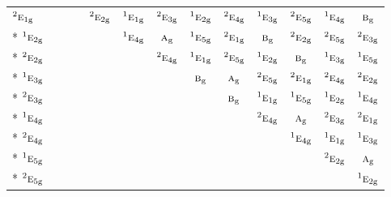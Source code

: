 \documentclass[10pt,a4paper]{article}
\numberwithin{equation}{section}
\newcommand{\irr}[1]{\text{\normalfont\scshape #1}}
\newcommand{\conjpair}[1]{{}^{#1}}
\newcommand{\ptag}[1]{\mathrm{#1}}
\begin{document}
{\begin{longtable}{@{}lcccccccccccc@{}}
$\conjpair{2}\irr{e}_{1\ptag{g}}$ &  &  &  & $\conjpair{2}\irr{e}_{2\ptag{g}}$ & $\conjpair{1}\irr{e}_{1\ptag{g}}$ & $\conjpair{2}\irr{e}_{3\ptag{g}}$ & $\conjpair{1}\irr{e}_{2\ptag{g}}$ & $\conjpair{2}\irr{e}_{4\ptag{g}}$ & $\conjpair{1}\irr{e}_{3\ptag{g}}$ & $\conjpair{2}\irr{e}_{5\ptag{g}}$ & $\conjpair{1}\irr{e}_{4\ptag{g}}$ & $\irr{b}_{\ptag{g}}$\\*
$\conjpair{1}\irr{e}_{2\ptag{g}}$ &  &  &  &  & $\conjpair{1}\irr{e}_{4\ptag{g}}$ & $\irr{a}_{\ptag{g}}$ & $\conjpair{1}\irr{e}_{5\ptag{g}}$ & $\conjpair{2}\irr{e}_{1\ptag{g}}$ & $\irr{b}_{\ptag{g}}$ & $\conjpair{2}\irr{e}_{2\ptag{g}}$ & $\conjpair{2}\irr{e}_{5\ptag{g}}$ & $\conjpair{2}\irr{e}_{3\ptag{g}}$\\*
$\conjpair{2}\irr{e}_{2\ptag{g}}$ &  &  &  &  &  & $\conjpair{2}\irr{e}_{4\ptag{g}}$ & $\conjpair{1}\irr{e}_{1\ptag{g}}$ & $\conjpair{2}\irr{e}_{5\ptag{g}}$ & $\conjpair{1}\irr{e}_{2\ptag{g}}$ & $\irr{b}_{\ptag{g}}$ & $\conjpair{1}\irr{e}_{3\ptag{g}}$ & $\conjpair{1}\irr{e}_{5\ptag{g}}$\\*
$\conjpair{1}\irr{e}_{3\ptag{g}}$ &  &  &  &  &  &  & $\irr{b}_{\ptag{g}}$ & $\irr{a}_{\ptag{g}}$ & $\conjpair{2}\irr{e}_{5\ptag{g}}$ & $\conjpair{2}\irr{e}_{1\ptag{g}}$ & $\conjpair{2}\irr{e}_{4\ptag{g}}$ & $\conjpair{2}\irr{e}_{2\ptag{g}}$\\*
$\conjpair{2}\irr{e}_{3\ptag{g}}$ &  &  &  &  &  &  &  & $\irr{b}_{\ptag{g}}$ & $\conjpair{1}\irr{e}_{1\ptag{g}}$ & $\conjpair{1}\irr{e}_{5\ptag{g}}$ & $\conjpair{1}\irr{e}_{2\ptag{g}}$ & $\conjpair{1}\irr{e}_{4\ptag{g}}$\\*
$\conjpair{1}\irr{e}_{4\ptag{g}}$ &  &  &  &  &  &  &  &  & $\conjpair{2}\irr{e}_{4\ptag{g}}$ & $\irr{a}_{\ptag{g}}$ & $\conjpair{2}\irr{e}_{3\ptag{g}}$ & $\conjpair{2}\irr{e}_{1\ptag{g}}$\\*
$\conjpair{2}\irr{e}_{4\ptag{g}}$ &  &  &  &  &  &  &  &  &  & $\conjpair{1}\irr{e}_{4\ptag{g}}$ & $\conjpair{1}\irr{e}_{1\ptag{g}}$ & $\conjpair{1}\irr{e}_{3\ptag{g}}$\\*
$\conjpair{1}\irr{e}_{5\ptag{g}}$ &  &  &  &  &  &  &  &  &  &  & $\conjpair{2}\irr{e}_{2\ptag{g}}$ & $\irr{a}_{\ptag{g}}$\\*
$\conjpair{2}\irr{e}_{5\ptag{g}}$ &  &  &  &  &  &  &  &  &  &  &  & $\conjpair{1}\irr{e}_{2\ptag{g}}$\\
\bottomrule\end{longtable}}
\end{document}
